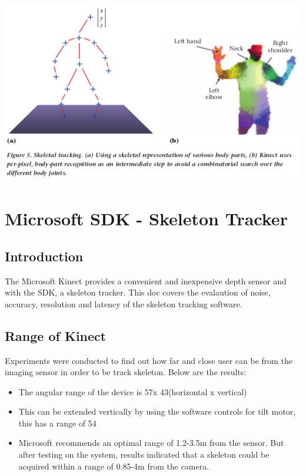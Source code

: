 \documentclass[a4paper,10pt]{report}
\begin{document}
\newline
\newline
\includegraphics[scale=0.4]{./4.png}
\newline
\newline

\section{Microsoft SDK - Skeleton Tracker}

\subsection{Introduction}
The Microsoft Kinect provides a convenient and inexpensive depth sensor and with the SDK, a skeleton tracker. This doc covers the evalaution of noise, accuracy, resolution and latency of the skeleton tracking software.

\subsection{Range of Kinect}
Experiments were conducted to find out how far and close user can be from the imaging sensor in order to be track skeleton. Below are the results:
\begin{itemize}
 \item The angular range of the device is 57\textdegree x 43\textdegree (horizontal x vertical)
 \item This can be extended vertically by using the software controls for tilt motor, this has a range of 54\textdegree
 \item Microsoft recommends an optimal range of 1.2-3.5m from the sensor. But after testing on the system, results indicated that a skeleton could be acquired within a range of 0.85-4m from the camera.
\end{itemize}
\end{document}
